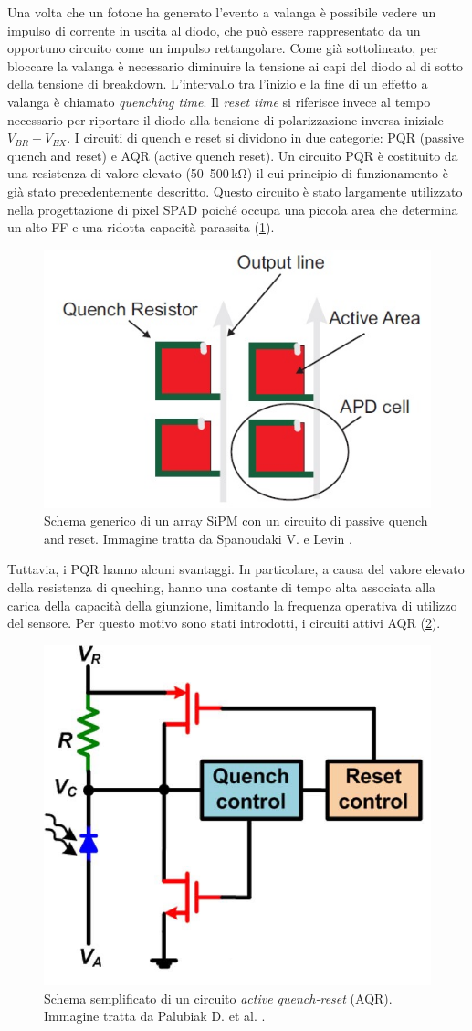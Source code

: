 Una volta che un fotone ha generato l'evento a valanga è possibile vedere un impulso di corrente in uscita al diodo, che può essere rappresentato da un opportuno circuito come un impulso rettangolare. Come già sottolineato, per bloccare la valanga è necessario diminuire la tensione ai capi del diodo al di sotto della tensione di breakdown. L'intervallo tra l'inizio e la fine di un effetto a valanga è chiamato \textit{quenching time}. Il \textit{reset time} si riferisce invece al tempo necessario per riportare il diodo alla tensione di polarizzazione inversa iniziale $V_{BR}+V_{EX}$. I circuiti di quench e reset si dividono in due categorie: PQR (passive quench and reset) e AQR (active quench reset). Un circuito PQR è costituito da una resistenza di valore elevato (\numrange[range-phrase=--]{50}{500}\,\unit{\kilo\ohm}) il cui principio di funzionamento è già stato precedentemente descritto. Questo circuito è stato largamente utilizzato nella progettazione di pixel SPAD poiché occupa una piccola area che determina un alto FF e una ridotta capacità parassita (\Fig\ref{fig:pqr_array}). 
\begin{figure}[t]
	\centering
	\includegraphics[width=0.6\linewidth]{./ImageFiles/pqr_pixels.jpg}
	\caption{Schema generico di un array SiPM con un circuito di passive quench and reset. Immagine tratta da Spanoudaki V. e Levin \cite{Spanoudaki2010}.}
	\label{fig:pqr_array}
\end{figure} 
Tuttavia, i PQR hanno alcuni svantaggi. In particolare, a causa del valore elevato della resistenza di queching, hanno una costante di tempo alta associata alla carica della capacità della giunzione, limitando la frequenza operativa di utilizzo del sensore. Per questo motivo sono stati introdotti, i circuiti attivi AQR (\Fig\ref{fig:aqr}).
\begin{figure}[b]
	\centering
	\includegraphics[width=0.35\linewidth]{./ImageFiles/aqr.jpg}
	\caption{Schema semplificato di un circuito \textit{active quench-reset} (AQR). Immagine tratta da Palubiak D. et al. \cite{Palubiak2011}.}
	\label{fig:aqr}
\end{figure} 
